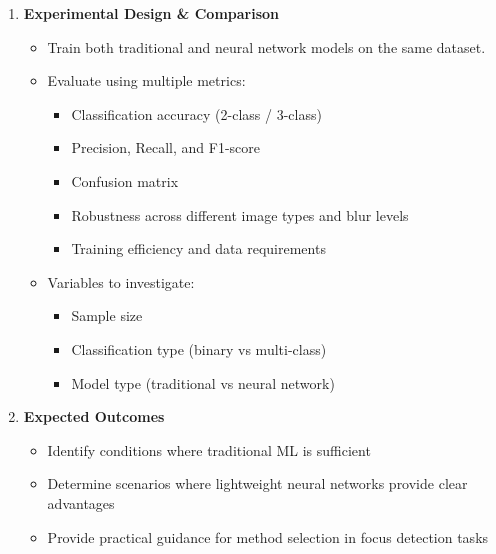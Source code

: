 \begin{enumerate}
    \item \textbf{Experimental Design \& Comparison}
          \begin{itemize}
              \item Train both traditional and neural network models on the same dataset.
              \item Evaluate using multiple metrics:
                    \begin{itemize}
                        \item Classification accuracy (2-class / 3-class)
                        \item Precision, Recall, and F1-score
                        \item Confusion matrix
                        \item Robustness across different image types and blur levels
                        \item Training efficiency and data requirements
                    \end{itemize}
              \item Variables to investigate:
                    \begin{itemize}
                        \item Sample size
                        \item Classification type (binary vs multi-class)
                        \item Model type (traditional vs neural network)
                    \end{itemize}
          \end{itemize}

    \item \textbf{Expected Outcomes}
          \begin{itemize}
              \item Identify conditions where traditional ML is sufficient
              \item Determine scenarios where lightweight neural networks provide clear advantages
              \item Provide practical guidance for method selection in focus detection tasks
          \end{itemize}

\end{enumerate}